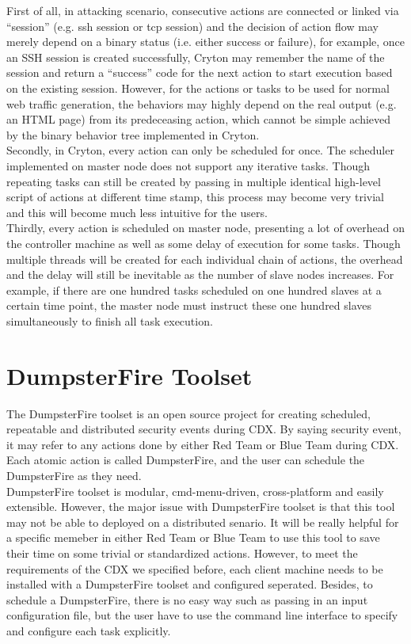 \documentclass[12pt]{report}
\begin{document}
First of all, in attacking scenario, consecutive actions are connected or linked via “session” (e.g. ssh session or tcp session) and the decision of action flow may merely depend on a binary status (i.e. either success or failure), for example, once an SSH session is created successfully, Cryton may remember the name of the session and return a “success” code for the next action to start execution based on the existing session. However, for the actions or tasks to be used for normal web traffic generation, the behaviors may highly depend on the real output (e.g. an HTML page) from its predeceasing action, which cannot be simple achieved by the binary behavior tree implemented in Cryton.\\

Secondly, in Cryton, every action can only be scheduled for once. The scheduler implemented on master node does not support any iterative tasks. Though repeating tasks can still be created by passing in multiple identical high-level script of actions at different time stamp, this process may become very trivial and this will become much less intuitive for the users.\\

Thirdly, every action is scheduled on master node, presenting a lot of overhead on the controller machine as well as some delay of execution for some tasks. Though multiple threads will be created for each individual chain of actions, the overhead and the delay will still be inevitable as the number of slave nodes increases. For example, if there are one hundred tasks scheduled on one hundred slaves at a certain time point, the master node must instruct these one hundred slaves simultaneously to finish all task execution. 

\section{DumpsterFire Toolset}
The DumpsterFire toolset \citep{Dumpsterfire} is an open source project for creating scheduled, repeatable and distributed security events during CDX. By saying security event, it may refer to any actions done by either Red Team or Blue Team during CDX. Each atomic action is called DumpsterFire, and the user can schedule the DumpsterFire as they need.\\

DumpsterFire toolset is modular, cmd-menu-driven, cross-platform and easily extensible. However, the major issue with DumpsterFire toolset is that this tool may not be able to deployed on a distributed senario. It will be really helpful for a specific memeber in either Red Team or Blue Team to use this tool to save their time on some trivial or standardized actions. However, to meet the requirements of the CDX we specified before, each client machine needs to be installed with a DumpsterFire toolset and configured seperated. Besides, to schedule a DumpsterFire, there is no easy way such as passing in an input configuration file, but the user have to use the command line interface to specify and configure each task explicitly.
\end{document}
